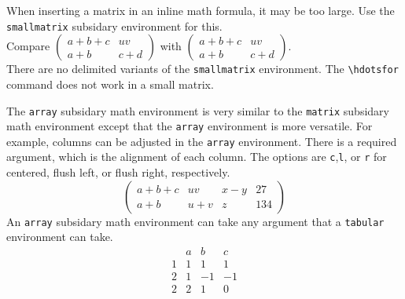 \documentclass[12pt]{amsart}
\begin{document}
When inserting a matrix in an inline math formula, it may be too large. Use the \texttt{smallmatrix} subsidary environment for this. \\Compare
\( \left( \begin{matrix}
      a + b + c 	& uv \\
      a + b 	& c + d
   \end{matrix} \right)
\)
 with 
\( \left( \begin{smallmatrix}
      a + b + c 	& uv \\
      a + b 	& c + d
   \end{smallmatrix} \right)
\). \\
There are no delimited variants of the \texttt{smallmatrix} environment. The \verb+\hdotsfor+ command does not work in a small matrix. 
\vspace{15 pt}

The \texttt{array} subsidary math environment is very similar to the \texttt{matrix} subsidary math environment except that the \texttt{array} environment is more versatile. For example, columns can be adjusted in the \texttt{array} environment. There is a required argument, which is the alignment of each column. The options are \texttt{c},\texttt{l}, or \texttt{r} for centered, flush left, or flush right, respectively.
\begin{equation*}
   \left(
   \begin{array}{cccc}
      a + b + c 	& uv 		& x - y 		& 27 \\
      a + b 	& u + v 	& z 	 	& 134
   \end{array}
   \right)
\end{equation*}
An \texttt{array} subsidary math environment can take any argument that a \texttt{tabular} environment can take. 
\[
\begin{array}{r|rrr}
	& a 	& b 	& c \\
\hline
1	& 1	& 1 	& 1 \\
2 	& 1 	& -1 	& -1 \\
2  	& 2 	& 1 	& 0
\end{array}
\]
\vspace{15 pt}
\end{document}
